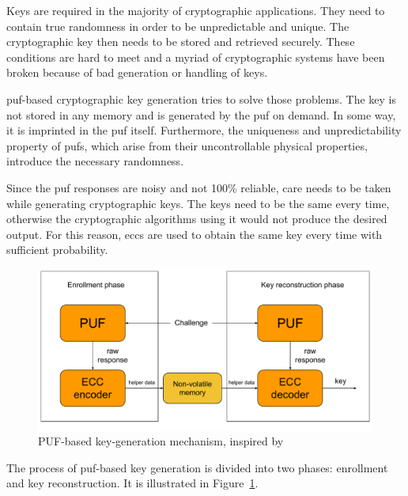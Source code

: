 Keys are required in the majority of cryptographic applications. They need to contain true randomness in order to be unpredictable and unique. The cryptographic key then needs to be stored and retrieved securely. These conditions are hard to meet and a myriad of cryptographic systems have been broken because of bad generation or handling of keys.\cite{Maes2012_2}

\gls{puf}-based cryptographic key generation tries to solve those problems. The key is not stored in any memory and is generated by the \gls{puf} on demand. In some way, it is imprinted in the \gls{puf} itself. Furthermore, the uniqueness and unpredictability property of \glspl{puf}, which arise from their uncontrollable physical properties, introduce the necessary randomness.

Since the \gls{puf} responses are noisy and not 100\% reliable, care needs to be taken while generating cryptographic keys. The keys need to be the same every time, otherwise the cryptographic algorithms using it would not produce the desired output. For this reason, \glspl{ecc} are used to obtain the same key every time with sufficient probability.

\begin{figure}[h!]
    \centering
    \captionsetup{justification=centering,margin=0.5cm}
    \includegraphics[width=\textwidth]{images/key_generation.pdf}
    \caption[PUF-based key-generation mechanism]{PUF-based key-generation mechanism, inspired by~\cite{Gao2017}}
    \label{fig:key_generation}
\end{figure}

The process of \gls{puf}-based key generation is divided into two phases: enrollment and key reconstruction\cite{Mispan2018}. It is illustrated in Figure~\ref{fig:key_generation}.

